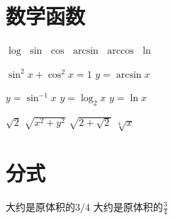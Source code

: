 \documentclass{ctexart}
\begin{document}
    \section{数学函数}
    $\log$
    $\sin$
    $\cos$
    $\arcsin$
    $\arccos$
    $\ln$

    $\sin^2 x + \cos^2 x = 1$
    $y = \arcsin x$
    
    $y = \sin^{-1} x$
    $y = \log_2 x$
    $y = \ln x$

    $\sqrt{2}$
    $\sqrt{x^2 + y^2}$
    $\sqrt{2 + \sqrt{2}}$
    $\sqrt[4]{x}$

    \section{分式}
    大约是原体积的$3/4$
    大约是原体积的$\frac{3}{4}$
\end{document}

